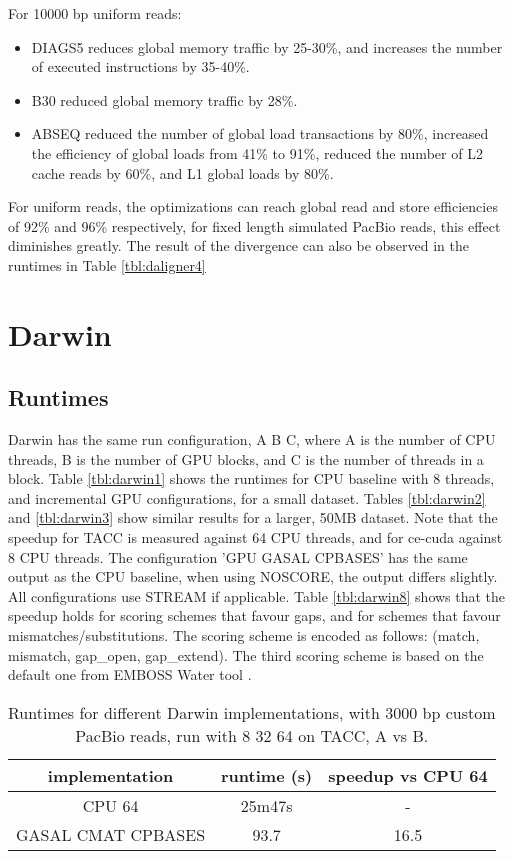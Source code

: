 \documentclass[../thesis.tex]{subfiles}
\begin{document}
For 10000 bp uniform reads:
\begin{itemize}
\item DIAGS5 reduces global memory traffic by 25-30\%, and increases the number of executed instructions by 35-40\%. \vspace{-10pt}
\item B30 reduced global memory traffic by 28\%. \vspace{-10pt}
\item ABSEQ reduced the number of global load transactions by 80\%, increased the efficiency of global loads from 41\% to 91\%, reduced the number of L2 cache reads by 60\%, and L1 global loads by 80\%.
\end{itemize}

For uniform reads, the optimizations can reach global read and store efficiencies of 92\% and 96\% respectively, for fixed length simulated PacBio reads, this effect diminishes greatly.
The result of the divergence can also be observed in the runtimes in Table \ref{tbl:daligner4}

\newpage

\section{Darwin}
\subsection{Runtimes}
Darwin has the same run configuration, A B C, where A is the number of CPU threads, B is the number of GPU blocks, and C is the number of threads in a block.
Table \ref{tbl:darwin1} shows the runtimes for CPU baseline with 8 threads, and incremental GPU configurations, for a small dataset.
Tables \ref{tbl:darwin2} and \ref{tbl:darwin3} show similar results for a larger, 50MB dataset.
Note that the speedup for TACC is measured against 64 CPU threads, and for ce-cuda against 8 CPU threads.
The configuration 'GPU GASAL CPBASES' has the same output as the CPU baseline, when using NOSCORE, the output differs slightly.
All configurations use STREAM if applicable.
Table \ref{tbl:darwin8} shows that the speedup holds for scoring schemes that favour gaps, and for schemes that favour mismatches/substitutions.
The scoring scheme is encoded as follows: (match, mismatch, gap\_open, gap\_extend).
The third scoring scheme is based on the default one from EMBOSS Water tool \cite{emboss}.

\begin{table}[h]
\centering
\caption{Runtimes for different Darwin implementations, with 3000 bp custom PacBio reads, run with 8 32 64 on TACC, A vs B.}
\label{tbl:darwin0}
\begin{tabular}{c c c}
implementation & runtime (s) & speedup vs CPU 64 \\ \hline
CPU 64 & 25m47s & -\\
GASAL CMAT CPBASES & 93.7 & 16.5 \\
\end{tabular}
\end{table}
\end{document}
